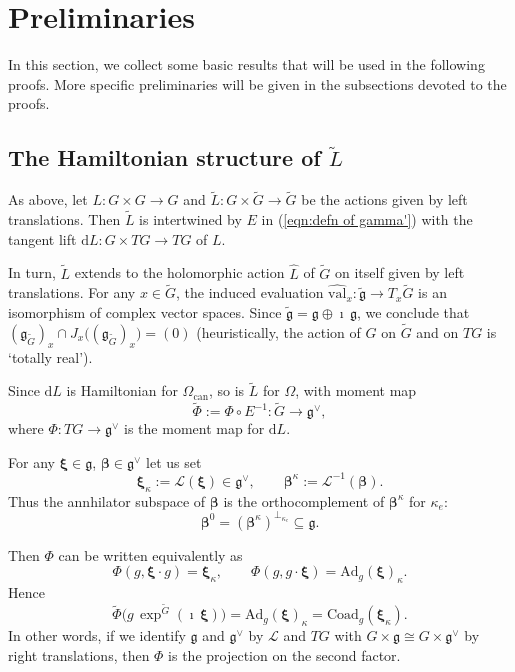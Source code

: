 \documentclass[12pt,a4paper]{article}
\theoremstyle{plain}
\theoremstyle{definition}
\begin{document}
\section{Preliminaries}
\label{sctn:prel}

In this section, we collect some basic results that will be used in the following proofs. More specific preliminaries
will be given in the subsections devoted to the proofs.

\subsection{The Hamiltonian structure of $\tilde{L}$}
\label{sctn:ham str L}
As above,
let $L:G\times G\rightarrow G$ and $\tilde{L}:G\times \tilde{G}\rightarrow \tilde{G}$ be the actions given by left translations. 
Then $\tilde{L}$ is intertwined by $E$ in (\ref{eqn:defn of gamma'}) with the tangent lift $\mathrm{d}L:G\times TG\rightarrow TG$ of $L$.

In turn, $\tilde{L}$ extends to the holomorphic action 
$\hat{L}$
of $\tilde{G}$
on itself given by left translations. 
For any $x\in \tilde{G}$, the induced evaluation 
$\widehat{\mathrm{val}}_{x}:\tilde{\mathfrak{g}}\rightarrow T_x\tilde{G}$
is an isomorphism of complex vector spaces.
Since $\tilde{\mathfrak{g}}=\mathfrak{g}\oplus \imath\,\mathfrak{g}$, 
we conclude that
$(\mathfrak{g}_{\tilde{G}})_x\cap J_x\big(
(\mathfrak{g}_{\tilde{G}})_x\big)=(0)$ (heuristically, the action of $G$
on $\tilde{G}$ and on $TG$ is \lq totally real\rq).


Since $\mathrm{d}L$ is Hamiltonian for $\Omega_{\mathrm{can}}$, so is $\tilde{L}$ for $\Omega$, with moment
map
$$
\tilde{\Phi}:=\Phi\circ E^{-1}:\tilde{G}\rightarrow \mathfrak{g}^\vee,
$$
where $\Phi:TG\rightarrow \mathfrak{g}^\vee$ is the moment map for 
$\mathrm{d}L$. 


For any $\boldsymbol{\xi}\in \mathfrak{g}$, 
$\boldsymbol{\beta}
\in \mathfrak{g}^\vee$ let us set
\begin{equation}
\label{eqn:defn di xik e betak}
\boldsymbol{\xi}_\kappa:=\mathcal{L}(\boldsymbol{\xi})\in \mathfrak{g}^\vee,\qquad\boldsymbol{\beta}^\kappa:=\mathcal{L}^{-1}(\boldsymbol{\beta}).
\end{equation}
%
Thus the annhilator subspace of $\boldsymbol{\beta}$ is the
orthocomplement of $\boldsymbol{\beta}^\kappa$ for $\kappa_e$:
$$
\boldsymbol{\beta}^0=(\boldsymbol{\beta}^\kappa)^{\perp_{\kappa_e}}
\subseteq \mathfrak{g}.
$$

%
Then $\Phi$ can be written equivalently as
$$
\Phi (g,\boldsymbol{\xi}\cdot g)=\boldsymbol{\xi}_\kappa,
\qquad \Phi (g,g\cdot \boldsymbol{\xi})
=\mathrm{Ad}_g(\boldsymbol{\xi})_\kappa.
$$
Hence
\begin{equation}
\label{eqn:moment map tilde G}
\tilde{\Phi}\big(g\,\exp^{\tilde{G}}(\imath\,\boldsymbol{\xi})\big)=
\mathrm{Ad}_g(\boldsymbol{\xi})_\kappa=\mathrm{Coad}_g(\boldsymbol{\xi}_\kappa).
\end{equation}
%
%
In other words, if we identify $\mathfrak{g}$ and $\mathfrak{g}^\vee$ 
by $\mathcal{L}$ and $TG$ with $G\times \mathfrak{g}\cong G\times \mathfrak{g}^\vee$ by right
translations, then $\Phi$ is the projection on the second factor.
%
\end{document}
